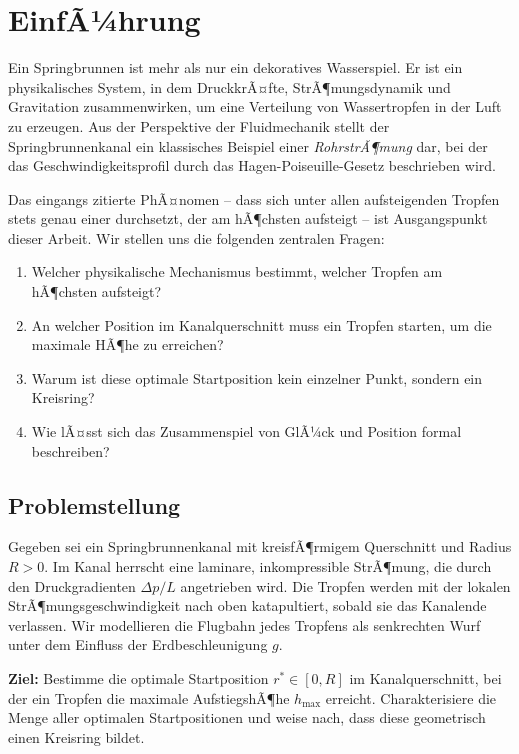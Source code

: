 ﻿\documentclass[a4paper,12pt]{article}
\theoremstyle{definition}
\begin{document}
\tableofcontents
\newpage

\section{EinfÃ¼hrung}

Ein Springbrunnen ist mehr als nur ein dekoratives Wasserspiel. Er ist ein physikalisches
System, in dem DruckkrÃ¤fte, StrÃ¶mungsdynamik und Gravitation zusammenwirken, um eine
Verteilung von Wassertropfen in der Luft zu erzeugen. Aus der Perspektive der Fluidmechanik
stellt der Springbrunnenkanal ein klassisches Beispiel einer
\emph{RohrstrÃ¶mung} dar, bei der das Geschwindigkeitsprofil durch das
Hagen-Poiseuille-Gesetz beschrieben wird.

Das eingangs zitierte PhÃ¤nomen -- dass sich unter allen aufsteigenden Tropfen stets genau einer
durchsetzt, der am hÃ¶chsten aufsteigt -- ist Ausgangspunkt dieser Arbeit. Wir stellen uns die
folgenden zentralen Fragen:

\begin{enumerate}
    \item Welcher physikalische Mechanismus bestimmt, welcher Tropfen am hÃ¶chsten aufsteigt?
    \item An welcher Position im Kanalquerschnitt muss ein Tropfen starten, um die
          maximale HÃ¶he zu erreichen?
    \item Warum ist diese optimale Startposition kein einzelner Punkt, sondern ein Kreisring?
    \item Wie lÃ¤sst sich das Zusammenspiel von GlÃ¼ck und Position formal beschreiben?
\end{enumerate}

\subsection{Problemstellung}

Gegeben sei ein Springbrunnenkanal mit kreisfÃ¶rmigem Querschnitt und Radius $R > 0$.
Im Kanal herrscht eine laminare, inkompressible StrÃ¶mung, die durch den Druckgradienten
$\Delta p / L$ angetrieben wird. Die Tropfen werden mit der lokalen StrÃ¶mungsgeschwindigkeit
nach oben katapultiert, sobald sie das Kanalende verlassen. Wir modellieren die Flugbahn
jedes Tropfens als senkrechten Wurf unter dem Einfluss der Erdbeschleunigung $g$.

\textbf{Ziel:} Bestimme die optimale Startposition $r^* \in [0, R]$ im Kanalquerschnitt,
bei der ein Tropfen die maximale AufstiegshÃ¶he $h_{\max}$ erreicht. Charakterisiere die
Menge aller optimalen Startpositionen und weise nach, dass diese geometrisch einen
Kreisring bildet.
\end{document}
